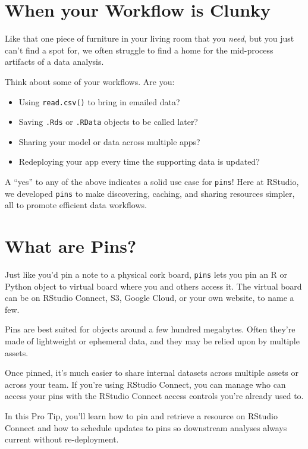 \documentclass[
  twocolumn]{article}
\author{}
\date{\vspace{-2.5em}}
\providecommand{\tightlist}{%
  \setlength{\itemsep}{0pt}\setlength{\parskip}{0pt}}
\begin{document}
\hypertarget{when-your-workflow-is-clunky}{%
\section{When your Workflow is
Clunky}\label{when-your-workflow-is-clunky}}

Like that one piece of furniture in your living room that you
\emph{need}, but you just can't find a spot for, we often struggle to
find a home for the mid-process artifacts of a data analysis.

Think about some of your workflows. Are you:

\begin{itemize}
\tightlist
\item
  Using \texttt{read.csv()} to bring in emailed data?
\item
  Saving \texttt{.Rds} or \texttt{.RData} objects to be called later?
\item
  Sharing your model or data across multiple apps?
\item
  Redeploying your app every time the supporting data is updated?
\end{itemize}

A ``yes'' to any of the above indicates a solid use case for
\texttt{pins}! Here at RStudio, we developed \texttt{pins} to make
discovering, caching, and sharing resources simpler, all to promote
efficient data workflows.

\hypertarget{what-are-pins}{%
\section{What are Pins?}\label{what-are-pins}}

Just like you'd pin a note to a physical cork board, \texttt{pins} lets
you pin an R or Python object to virtual board where you and others
access it. The virtual board can be on RStudio Connect, S3, Google
Cloud, or your own website, to name a few.

Pins are best suited for objects around a few hundred megabytes. Often
they're made of lightweight or ephemeral data, and they may be relied
upon by multiple assets.

Once pinned, it's much easier to share internal datasets across multiple
assets or across your team. If you're using RStudio Connect, you can
manage who can access your pins with the RStudio Connect access controls
you're already used to.

In this Pro Tip, you'll learn how to pin and retrieve a resource on
RStudio Connect and how to schedule updates to pins so downstream
analyses always current without re-deployment.
\end{document}
